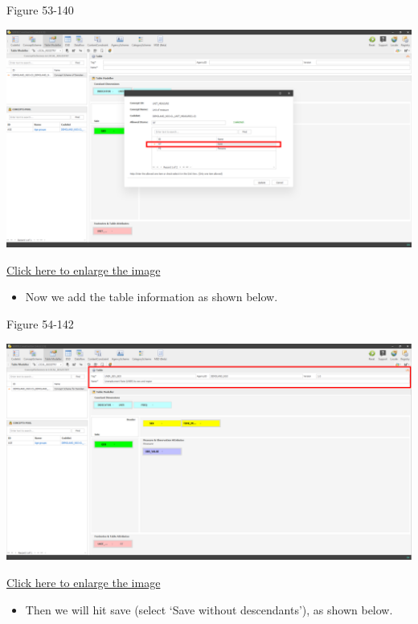 \documentclass[
]{book}
\providecommand{\tightlist}{%
  \setlength{\itemsep}{0pt}\setlength{\parskip}{0pt}}
\theoremstyle{definition}
\theoremstyle{definition}
\theoremstyle{definition}
\theoremstyle{definition}
\theoremstyle{remark}
\begin{document}
Figure 53-140

\begin{center}\includegraphics[width=1\linewidth]{./images/image140} \end{center}

\href{images/image140.png}{Click here to enlarge the image}

\begin{itemize}
\tightlist
\item
  Now we add the table information as shown below.
\end{itemize}

Figure 54-142

\begin{center}\includegraphics[width=1\linewidth]{./images/image142} \end{center}

\href{images/image142.png}{Click here to enlarge the image}

\begin{itemize}
\tightlist
\item
  Then we will hit save (select `Save without descendants'), as shown below.
\end{itemize}
\end{document}
